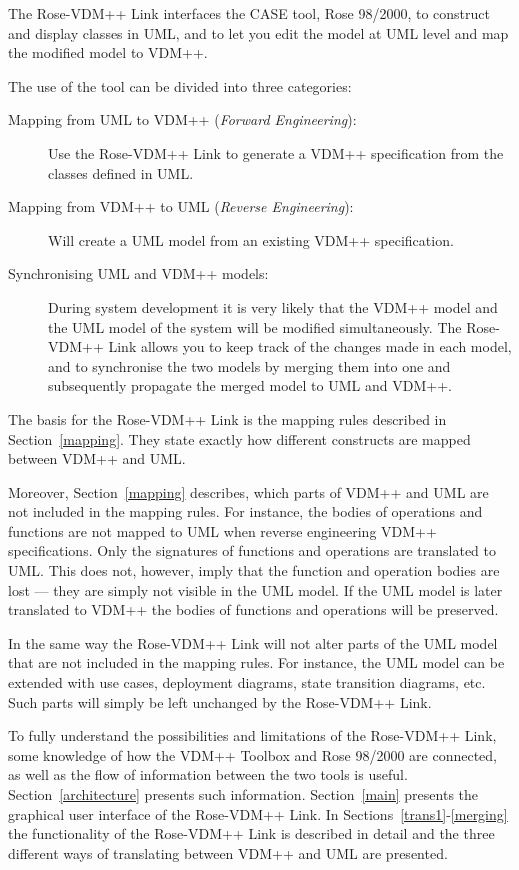 \documentclass[\pformat,12pt]{article}
\newcommand{\vdmpp}{VDM++}
\newcommand{\link}{Rose-\vdmpp{} Link}
\newcommand{\rose}{Rose 98/2000}
\begin{document}
The \link{} interfaces the CASE tool, \rose{}, to construct and
display classes in UML, and to let you edit the model at UML
level and map the modified model to \vdmpp{}.

The use of the tool can be divided into three categories:  

\begin{description}
\item[Mapping from UML to \vdmpp{} ({\em Forward Engineering}):] Use
  the \link{} to generate a \vdmpp{} specification from the classes
  defined in UML.
  
\item[Mapping from \vdmpp{} to UML ({\em Reverse Engineering}):] Will
  create a UML model from an existing \vdmpp{} specification.
  
\item[Synchronising UML and \vdmpp{} models:] During system
  development it is very likely that the \vdmpp{} model and the UML
  model of the system will be modified simultaneously. The \link{}
  allows you to keep track of the changes made in each model, and to
  synchronise the two models by merging them into one and
  subsequently propagate the merged model to UML and \vdmpp{}.
\end{description}

The basis for the \link{} is the mapping rules described in
Section~\ref{mapping}. They state exactly how different constructs are
mapped between \vdmpp{} and UML. 

Moreover, Section~\ref{mapping} describes, which parts of \vdmpp{} and
UML are not included in the mapping rules. For instance, the bodies of
operations and functions are not mapped to UML when reverse
engineering \vdmpp{} specifications. Only the signatures of functions
and operations are translated to UML. This does not, however, imply
that the function and operation bodies are lost --- they are simply
not visible in the UML model. If the UML model is later translated to
\vdmpp{} the bodies of functions and operations will be preserved.

In the same way the \link{} will not alter parts of the UML model that
are not included in the mapping rules. For instance, the UML model can
be extended with use cases, deployment diagrams, state transition
diagrams, etc. Such parts will simply be left unchanged by the
\link{}.

To fully understand the possibilities and limitations of the \link{},
some knowledge of how the \vdmpp{} Toolbox and \rose{} are connected,
as well as the flow of information between the two tools is
useful. Section~\ref{architecture} presents such information.
Section~\ref{main} presents the graphical user interface of the
\link{}. In Sections~\ref{trans1}-\ref{merging} the functionality of
the \link{} is described in detail and the three different ways of
translating between \vdmpp{} and UML are presented.
   
\end{document}
